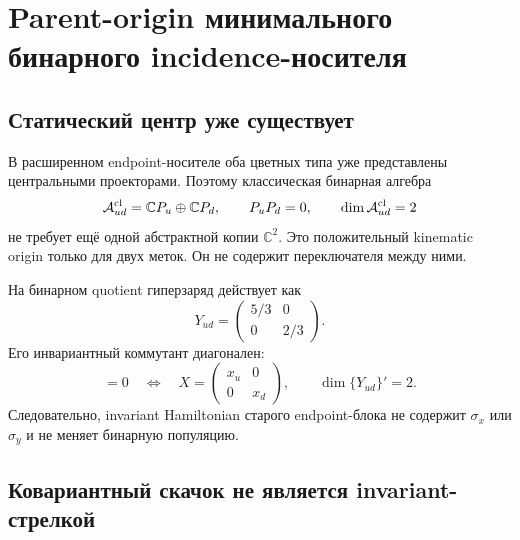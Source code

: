 \chapter{Parent-origin минимального бинарного incidence-носителя}
\label{ch:v8-up-down-binary-carrier-parent-origin}

\section{Статический центр уже существует}

В расширенном endpoint-носителе оба цветных типа уже представлены
центральными проекторами. Поэтому классическая бинарная алгебра
\begin{equation}
 \mathcal A_{ud}^{\rm cl}=\mathbb CP_u\oplus\mathbb CP_d,
 \qquad P_uP_d=0,\qquad \dim\mathcal A_{ud}^{\rm cl}=2
 \label{eq:v8-binary-carrier-existing-center}
\end{equation}
не требует ещё одной абстрактной копии $\mathbb C^2$. Это положительный
kinematic origin только для двух меток. Он не содержит переключателя между
ними.

На бинарном quotient гиперзаряд действует как
\begin{equation}
 Y_{ud}=\begin{pmatrix}5/3&0\\0&2/3\end{pmatrix}.
 \label{eq:v8-binary-carrier-hypercharge}
\end{equation}
Его инвариантный коммутант диагонален:
\begin{equation}
 [Y_{ud},X]=0
 \quad\Longleftrightarrow\quad
 X=\begin{pmatrix}x_u&0\\0&x_d\end{pmatrix},
 \qquad \dim\{Y_{ud}\}'=2.
 \label{eq:v8-binary-carrier-invariant-commutant}
\end{equation}
Следовательно, invariant Hamiltonian старого endpoint-блока не содержит
$\sigma_x$ или $\sigma_y$ и не меняет бинарную популяцию.

\section{Ковариантный скачок не является invariant-стрелкой}

